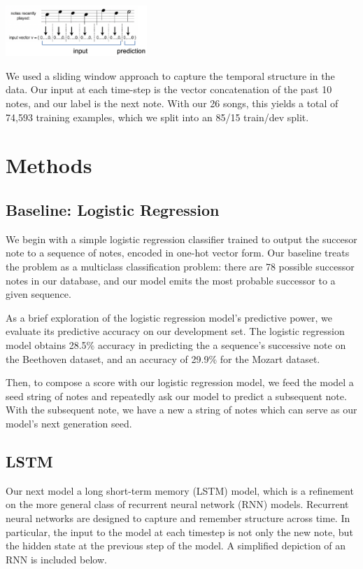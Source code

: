 \documentclass[twoside,twocolumn]{article}
\begin{document}
\includegraphics[width = 0.4\textwidth]{one-hot-encoding}

We used a sliding window approach to capture the temporal structure in the data. Our input at each time-step is the vector concatenation of the past 10 notes, and our label is the next note. With our 26 songs, this yields a total of 74,593 training examples, which we split into an 85/15 train/dev split.



\section{Methods}

\subsection{Baseline: Logistic Regression}

We begin with a simple logistic regression classifier trained to output the succesor note to a sequence of notes, encoded in one-hot vector form. Our baseline treats the problem as a multiclass classification problem: there are 78 possible successor notes in our database, and our model emits the most probable successor to a given sequence.

As a brief exploration of the logistic regression model's predictive power, we evaluate its predictive accuracy on our development set. The logistic regression model obtains 28.5\% accuracy in predicting the a sequence's successive note on the Beethoven dataset, and an accuracy of 29.9\% for the Mozart dataset.

Then, to compose a score with our logistic regression model, we feed the model a seed string of notes and repeatedly ask our model to predict a subsequent note. With the subsequent note, we have a new a string of notes which can serve as our model's next generation seed.

\subsection{LSTM}

Our next model a long short-term memory (LSTM) model, which is a refinement on the more general class of recurrent neural network (RNN) models. Recurrent neural networks are designed to capture and remember structure across time. In particular, the input to the model at each timestep is not only the new note, but the hidden state at the previous step of the model. A simplified depiction of an RNN is included below.
\end{document}
